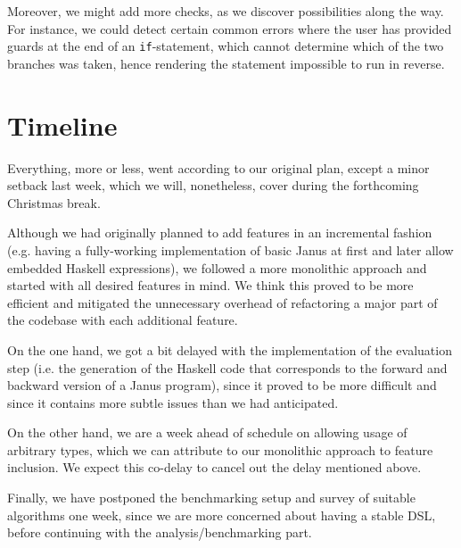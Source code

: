 \documentclass[12pt,a4paper]{article}
\newcommand{\code}[1]{\texttt{#1}}
\begin{document}
Moreover, we might add more checks, as we discover possibilities along the way. For instance, we could detect certain common errors where the user has provided guards at the end of an \code{if}-statement, which cannot determine which of the two branches was taken, hence rendering the statement impossible to run in reverse.

\section{Timeline}
Everything, more or less, went according to our original plan, except a minor setback last week, which we will, nonetheless, cover during the forthcoming Christmas break.

Although we had originally planned to add features in an incremental fashion (e.g. having a fully-working implementation of basic Janus at first and later allow embedded Haskell expressions), we followed a more monolithic approach and started with all desired features in mind. We think this proved to be more efficient and mitigated the unnecessary overhead of refactoring a major part of the codebase with each additional feature.

On the one hand, we got a bit delayed with the implementation of the evaluation step (i.e. the generation of the Haskell code that corresponds to the forward and backward version of a Janus program), since it proved to be more difficult and since it contains more subtle issues than we had anticipated.

On the other hand, we are a week ahead of schedule on allowing usage of arbitrary types, which we can attribute to our monolithic approach to feature inclusion. We expect this co-delay to cancel out the delay mentioned above.

Finally, we have postponed the benchmarking setup and survey of suitable algorithms one week, since we are more concerned about having a stable DSL, before continuing with the analysis/benchmarking part.

\newpage



\end{document}
